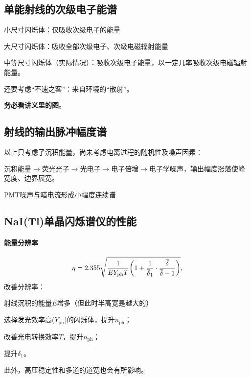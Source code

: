 \subsection{单能\gammaray 射线的次级电子能谱}

\begin{compactitem}
	\item 小尺寸闪烁体：仅吸收次级电子的能量
	\item 大尺寸闪烁体：吸收全部次级电子、次级电磁辐射能量
	\item 中等尺寸闪烁体（实际情况）：吸收次级电子能量，以一定几率吸收次级电磁辐射能量。
\end{compactitem}
还要考虑“不速之客”：来自环境的“散射”。

\textbf{务必看讲义里的图}。

\subsection{\gammaray 射线的输出脉冲幅度谱}

以上只考虑了沉积能量，尚未考虑电离过程的随机性及噪声因素：
\begin{compactitem}
	\item 沉积能量$\to$荧光光子$\to$光电子$\to$电子倍增$\to$电子学噪声，输出幅度涨落使峰宽度、边界展宽。
	\item PMT噪声与暗电流形成小幅度连续谱
\end{compactitem}

\subsection{NaI(Tl)单晶闪烁谱仪的性能}

\paragraph{能量分辨率}
\begin{equation}\label{eq:nrd-scintillator-resolution}
	\eta = 2.355\sqrt{\frac1{EY_{\mathrm{ph}}T}\biggl(1 + \frac1{\overline{\delta}_1} \cdot \frac{\overline{\delta}}{\overline{\delta} - 1}\biggr)},
\end{equation}
改善分辨率：
\begin{compactenum}
	\item 射线沉积的能量$E$增多（但此时半高宽是越大的）
	\item 选择发光效率高($Y_{\mathrm{ph}}$)的闪烁体，提升$n_{\mathrm{ph}}$；
	\item 改善光电转换效率$T$，提升$n_{\mathrm{ph}}$；
	\item 提升$\delta_1$。
\end{compactenum}
此外，高压稳定性和多道的道宽也会有所影响。
